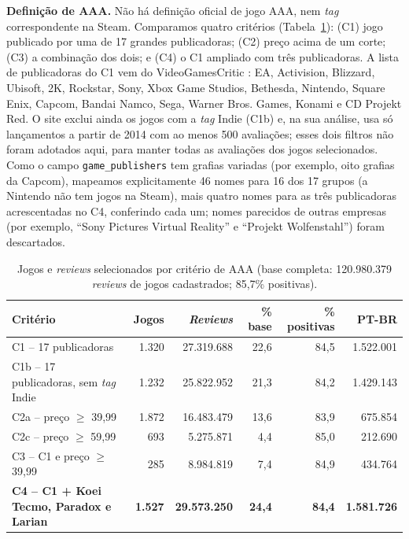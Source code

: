 \documentclass[12pt]{article}
\begin{document}
\textbf{Definição de AAA.} Não há definição oficial de jogo AAA, nem \textit{tag} correspondente
na Steam. Comparamos quatro critérios (Tabela~\ref{tab:criterios}): (C1) jogo publicado por uma de
17 grandes publicadoras; (C2) preço acima de um corte; (C3) a combinação dos dois; e (C4) o C1
ampliado com três publicadoras. A lista de publicadoras do C1 vem do VideoGamesCritic
\cite{vgc2026}: EA, Activision, Blizzard, Ubisoft, 2K, Rockstar, Sony, Xbox Game Studios, Bethesda,
Nintendo, Square Enix, Capcom, Bandai Namco, Sega, Warner Bros. Games, Konami e CD Projekt Red.
O site exclui ainda os jogos com a \textit{tag} Indie (C1b) e, na sua análise, usa só lançamentos a partir de 2014 com ao menos 500 avaliações; esses dois filtros não foram adotados aqui, para manter todas as avaliações dos jogos selecionados. Como o campo \texttt{game\_publishers}
tem grafias variadas (por exemplo, oito grafias da Capcom), mapeamos explicitamente 46 nomes para
16 dos 17 grupos (a Nintendo não tem jogos na Steam), mais quatro nomes para as três publicadoras
acrescentadas no C4, conferindo cada um; nomes parecidos de outras
empresas (por exemplo, ``Sony Pictures Virtual Reality'' e ``Projekt Wolfenstahl'') foram
descartados.

\begin{table}[ht]
\centering
\caption{Jogos e \textit{reviews} selecionados por critério de AAA (base completa: 120.980.379 \textit{reviews} de jogos cadastrados; 85,7\% positivas).}\label{tab:criterios}
\footnotesize
\begin{tabular}{lrrrrr}
\toprule
Critério & Jogos & \textit{Reviews} & \% base & \% positivas & PT-BR \\
\midrule
C1 -- 17 publicadoras & 1.320 & 27.319.688 & 22,6 & 84,5 & 1.522.001 \\
C1b -- 17 publicadoras, sem \textit{tag} Indie & 1.232 & 25.822.952 & 21,3 & 84,2 & 1.429.143 \\
C2a -- preço $\geq$ 39,99 & 1.872 & 16.483.479 & 13,6 & 83,9 & 675.854 \\
C2c -- preço $\geq$ 59,99 & 693 & 5.275.871 & 4,4 & 85,0 & 212.690 \\
C3 -- C1 e preço $\geq$ 39,99 & 285 & 8.984.819 & 7,4 & 84,9 & 434.764 \\
\textbf{C4 -- C1 + Koei Tecmo, Paradox e Larian} & \textbf{1.527} & \textbf{29.573.250} & \textbf{24,4} & \textbf{84,4} & \textbf{1.581.726} \\
\bottomrule
\end{tabular}
\end{table}
\end{document}
